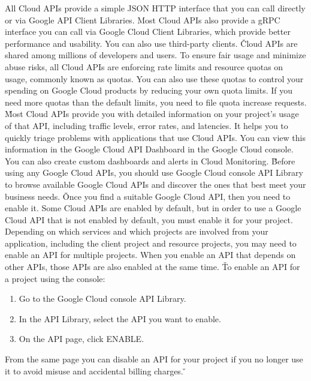 All Cloud APIs provide a simple JSON HTTP interface that you can call directly or via Google API Client Libraries.
Most Cloud APIs also provide a gRPC interface you can call via Google Cloud Client Libraries, which provide better
performance and usability. You can also use third-party clients. \v

Cloud APIs are shared among millions of developers and users. To ensure fair usage and minimize abuse risks, all
Cloud APIs are enforcing rate limits and resource quotas on usage, commonly known as quotas. You can also use these
quotas to control your spending on Google Cloud products by reducing your own quota limits. If you need more quotas
than the default limits, you need to file quota increase requests. \v

Most Cloud APIs provide you with detailed information on your project's usage of that API, including traffic levels,
error rates, and latencies. It helps you to quickly triage problems with applications that use Cloud APIs. You can
view this information in the Google Cloud API Dashboard in the Google Cloud console. You can also create custom
dashboards and alerts in Cloud Monitoring. \v

Before using any Google Cloud APIs, you should use Google Cloud console API Library to browse available Google Cloud
APIs and discover the ones that best meet your business needs. \v

Once you find a suitable Google Cloud API, then you need to enable it. Some Cloud APIs are enabled by default, but in
order to use a Google Cloud API that is not enabled by default, you must enable it for your project. Depending on which
services and which projects are involved from your application, including the client project and resource projects,
you may need to enable an API for multiple projects. When you enable an API that depends on other APIs, those APIs
are also enabled at the same time. \v

To enable an API for a project using the console:
\begin{enumerate}
\item Go to the Google Cloud console API Library.
\item In the API Library, select the API you want to enable.
\item On the API page, click ENABLE.
\end{enumerate}

From the same page you can disable an API for your project if you no longer use it to avoid misuse and accidental
billing charges. \v

